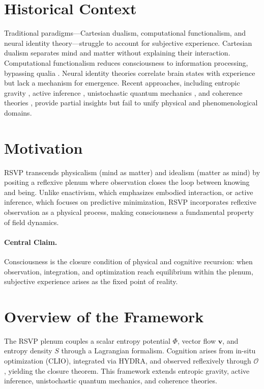 \documentclass[12pt]{book}
\theoremstyle{definition}
\begin{document}
\section{Historical Context}
\label{sec:historical}
Traditional paradigms—Cartesian dualism, computational functionalism, and neural identity theory—struggle to account for subjective experience. Cartesian dualism separates mind and matter without explaining their interaction. Computational functionalism reduces consciousness to information processing, bypassing qualia \cite{chalmers1996conscious}. Neural identity theories correlate brain states with experience but lack a mechanism for emergence. Recent approaches, including entropic gravity \cite{jacobson1995thermodynamics, verlinde2011origin, gibbs2025entropic}, active inference \cite{friston2023active, friston2025beautiful}, unistochastic quantum mechanics \cite{barandes2024new, barandes2025unistochastic}, and coherence theories \cite{logan2024unified, logan2025coherence}, provide partial insights but fail to unify physical and phenomenological domains.

\section{Motivation}
\label{sec:motivation}
RSVP transcends physicalism (mind as matter) and idealism (matter as mind) by positing a reflexive plenum where observation closes the loop between knowing and being. Unlike enactivism, which emphasizes embodied interaction, or active inference, which focuses on predictive minimization, RSVP incorporates reflexive observation as a physical process, making consciousness a fundamental property of field dynamics.

\paragraph{Central Claim.}
Consciousness is the closure condition of physical and cognitive recursion: when observation, integration, and optimization reach equilibrium within the plenum, subjective experience arises as the fixed point of reality.

\section{Overview of the Framework}
\label{sec:overview}
The RSVP plenum couples a scalar entropy potential $\Phi$, vector flow $\mathbf{v}$, and entropy density $S$ through a Lagrangian formalism. Cognition arises from in-situ optimization (CLIO), integrated via HYDRA, and observed reflexively through $\mathcal{O}$, yielding the closure theorem. This framework extends entropic gravity, active inference, unistochastic quantum mechanics, and coherence theories.
\end{document}
